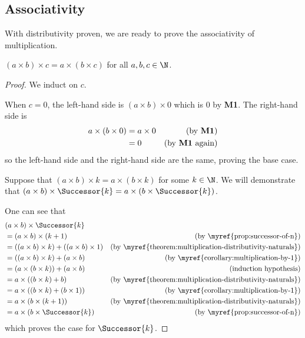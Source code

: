 \subsection{Associativity}
With distributivity proven, we are ready to prove the associativity of multiplication.

\begin{theorem}\label{theorem:multiplication-associative-naturals}
    $(a \times b) \times c = a \times (b \times c)$ for all $a, b, c \in \N$.
\end{theorem}
\begin{proof}
    We induct on $c$.

    When $c = 0$, the left-hand side is $(a \times b) \times 0$ which is 0 by \textbf{M1}. The right-hand side is
    \begin{align*}
        a \times (b \times 0) &= a \times 0 & (\text{by \textbf{M1}})\\
        &= 0  & (\text{by \textbf{M1} again})
    \end{align*}
    so the left-hand side and the right-hand side are the same, proving the base case.

    Suppose that $(a \times b) \times k = a \times (b \times k)$ for some $k \in \N$. We will demonstrate that $(a \times b) \times \Successor{k} = a \times (b \times \Successor{k})$.

    One can see that
    \begin{align*}
        &(a \times b) \times \Successor{k}\\
        &= (a \times b) \times (k + 1) & (\text{by \myref{prop:successor-of-n}})\\
        &= ((a \times b) \times k) + ((a \times b) \times 1) & (\text{by \myref{theorem:multiplication-distributivity-naturals}})\\
        &= ((a \times b) \times k) + (a \times b) & (\text{by \myref{corollary:multiplication-by-1}})\\
        &= (a \times(b \times k)) + (a \times b) & (\text{induction hypothesis})\\
        &= a \times ((b \times k) + b) & (\text{by \myref{theorem:multiplication-distributivity-naturals}})\\
        &= a \times ((b \times k) + (b \times 1)) & (\text{by \myref{corollary:multiplication-by-1}})\\
        &= a \times (b \times (k + 1)) & (\text{by \myref{theorem:multiplication-distributivity-naturals}})\\
        &= a \times (b \times \Successor{k}) & (\text{by \myref{prop:successor-of-n}})
    \end{align*}
    which proves the case for $\Successor{k}$.
\end{proof}

